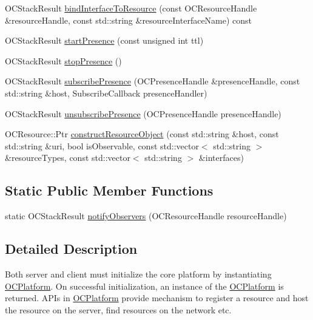 \begin{DoxyCompactItemize}
\item 
O\+C\+Stack\+Result \hyperlink{classOC_1_1OCPlatform_a55af2bebffbb02dc23095ae05b07953b}{bind\+Interface\+To\+Resource} (const O\+C\+Resource\+Handle \&resource\+Handle, const std\+::string \&resource\+Interface\+Name) const 
\item 
O\+C\+Stack\+Result \hyperlink{classOC_1_1OCPlatform_afc2cc6fbe5462889de8d9227e562fa51}{start\+Presence} (const unsigned int ttl)
\item 
O\+C\+Stack\+Result \hyperlink{classOC_1_1OCPlatform_a102fa0b664d1b4cb745d2b399c385d09}{stop\+Presence} ()
\item 
O\+C\+Stack\+Result \hyperlink{classOC_1_1OCPlatform_a3540fc18922f4872365851f355d5d2a1}{subscribe\+Presence} (O\+C\+Presence\+Handle \&presence\+Handle, const std\+::string \&host, Subscribe\+Callback presence\+Handler)
\item 
O\+C\+Stack\+Result \hyperlink{classOC_1_1OCPlatform_aae5febb1875a586c3e9a76b49bbba2a3}{unsubscribe\+Presence} (O\+C\+Presence\+Handle presence\+Handle)
\item 
O\+C\+Resource\+::\+Ptr \hyperlink{classOC_1_1OCPlatform_a3a95d7c7d19f1829762ad29b379251d7}{construct\+Resource\+Object} (const std\+::string \&host, const std\+::string \&uri, bool is\+Observable, const std\+::vector$<$ std\+::string $>$ \&resource\+Types, const std\+::vector$<$ std\+::string $>$ \&interfaces)
\end{DoxyCompactItemize}
\subsection*{Static Public Member Functions}
\begin{DoxyCompactItemize}
\item 
static O\+C\+Stack\+Result \hyperlink{classOC_1_1OCPlatform_af82a6b49cb77a78e3f917bc8b9f774ea}{notify\+Observers} (O\+C\+Resource\+Handle resource\+Handle)
\end{DoxyCompactItemize}


\subsection{Detailed Description}
Both server and client must initialize the core platform by instantiating \hyperlink{classOC_1_1OCPlatform}{O\+C\+Platform}. On successful initialization, an instance of the \hyperlink{classOC_1_1OCPlatform}{O\+C\+Platform} is returned. A\+P\+Is in \hyperlink{classOC_1_1OCPlatform}{O\+C\+Platform} provide mechanism to register a resource and host the resource on the server, find resources on the network etc. 

